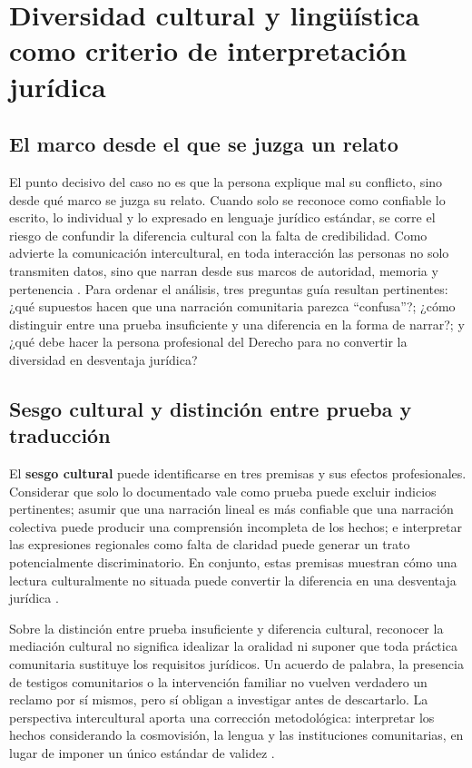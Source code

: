 \documentclass[
  spanish,
  letterpaper, oneside
]{article}
\begin{document}
\section{Diversidad cultural y lingüística como criterio de interpretación jurídica}

\subsection{El marco desde el que se juzga un relato}

El punto decisivo del caso no es que la persona explique mal su conflicto, sino
desde qué marco se juzga su relato. Cuando solo se reconoce como confiable lo
escrito, lo individual y lo expresado en lenguaje jurídico estándar, se corre el
riesgo de confundir la diferencia cultural con la falta de credibilidad. Como
advierte la comunicación intercultural, en toda interacción las personas no solo
transmiten datos, sino que narran desde sus marcos de autoridad, memoria y
pertenencia \citep{pech2016manual}. Para ordenar el análisis, tres preguntas guía
resultan pertinentes: ¿qué supuestos hacen que una narración comunitaria parezca
``confusa''?; ¿cómo distinguir entre una prueba insuficiente y una diferencia en la
forma de narrar?; y ¿qué debe hacer la persona profesional del Derecho para no
convertir la diversidad en desventaja jurídica?

\subsection{Sesgo cultural y distinción entre prueba y traducción}

El \textbf{sesgo cultural} puede identificarse en tres premisas y sus efectos profesionales. Considerar que solo lo documentado vale como prueba puede excluir indicios pertinentes; asumir que una narración lineal es más confiable que una narración colectiva puede producir una comprensión incompleta de los hechos; e interpretar las expresiones regionales como falta de claridad puede generar un trato potencialmente discriminatorio. En conjunto, estas premisas muestran cómo una lectura culturalmente no situada puede convertir la diferencia en una desventaja jurídica \citep{pech2016manual}.

Sobre la distinción entre prueba insuficiente y diferencia cultural, reconocer la
mediación cultural no significa idealizar la oralidad ni suponer que toda práctica
comunitaria sustituye los requisitos jurídicos. Un acuerdo de palabra, la presencia
de testigos comunitarios o la intervención familiar no vuelven verdadero un reclamo
por sí mismos, pero sí obligan a investigar antes de descartarlo. La perspectiva
intercultural aporta una corrección metodológica: interpretar los hechos
considerando la cosmovisión, la lengua y las instituciones comunitarias, en lugar
de imponer un único estándar de validez \citep{scjn2022protocolo}.
\end{document}
